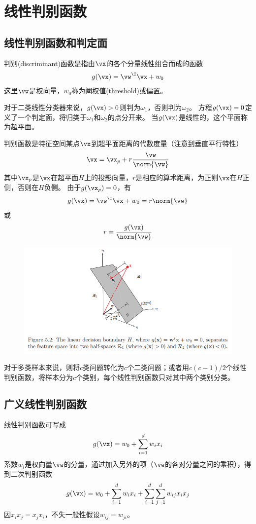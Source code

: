 
\section{线性判别函数} %

\subsection{线性判别函数和判定面}
判别(discriminant)函数是指由$\vx$的各个分量线性组合而成的函数
\[g(\vx)=\vw^\T\vx+w_0\]
这里$\vw$是权向量，$w_0$称为阈权值(threshold)或偏置。

对于二类线性分类器来说，$g(\vx)>0$则判为$\omega_1$，否则判为$\omega_2$。
方程$g(\vx)=0$定义了一个判定面，将归类于$\omega_1$和$\omega_2$的点分开来。
当$g(\vx)$是线性的，这个平面称为超平面。

判别函数是特征空间某点$\vx$到超平面距离的代数度量（注意到垂直平行特性）
\[\vx=\vx_p+r\frac{\vw}{\norm{\vw}}\]
其中$\vx_p$是$\vx$在超平面$H$上的投影向量，$r$是相应的算术距离，为正则$\vx$在$H$正侧，否则在$H$负侧。
由于$g(\vx_p)=0$，有
\[g(\vx)=\vw^\T\vx+w_0=r\norm{\vw}\]
或
\[r=\frac{g(\vx)}{\norm{\vw}}\]
\begin{figure}[H]
\centering
\includegraphics[width=0.9\linewidth]{fig/linear_decision_boundary.png}
\end{figure}

对于多类样本来说，则将$c$类问题转化为$c$个二类问题；或者用$c(c-1)/2$个线性判别函数，将样本分为$c$个类别，每个线性判别函数只对其中两个类别分类。

\subsection{广义线性判别函数}
线性判别函数可写成
\[g(\vx)=w_0+\sum_{i=1}^d w_i x_i\]
系数$w_i$是权向量$\vw$的分量，通过加入另外的项（$\vw$的各对分量之间的乘积），得到二次判别函数
\[g(\vx)=w_0+\sum_{i=1}^d w_ix_i+\sum_{i=1}^d\sum_{j=1}^d w_{ij}x_ix_j\]
因$x_ix_j=x_jx_i$，不失一般性假设$w_{ij}=w_{ji}$。

